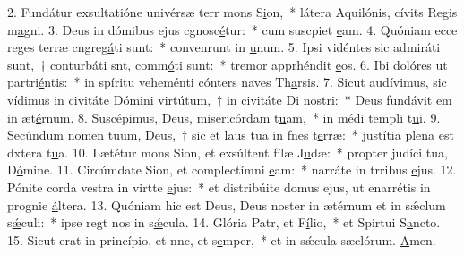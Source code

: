 2. Fundátur exsultatióne univérsæ terr mons S\uline{i}on,~* látera Aquilónis, cívits Regis m\uline{a}gni.
3. Deus in dómibus ejus cgnosc\uline{é}tur:~* cum suscpiet \uline{e}am.
4. Quóniam ecce reges terræ cngreg\uline{á}ti sunt:~* convenrunt in \uline{u}num.
5. Ipsi vidéntes sic admiráti sunt,~† conturbáti snt, comm\uline{ó}ti sunt:~* tremor apprhéndit \uline{e}os.
6. Ibi dolóres ut partri\uline{é}ntis:~* in spíritu veheménti cónters naves Th\uline{a}rsis.
7. Sicut audívimus, sic vídimus in civitáte Dómini virtútum,~† in civitáte Di n\uline{o}stri:~* Deus fundávit em in æt\uline{é}rnum.
8. Suscépimus, Deus, misericórdam t\uline{u}am,~* in médi templi t\uline{u}i.
9. Secúndum nomen tuum, Deus,~† sic et laus tua in fnes t\uline{e}rræ:~* justítia plena est dxtera t\uline{u}a.
10. Lætétur mons Sion, et exsúltent fílæ J\uline{u}dæ:~* propter judíci tua, D\uline{ó}mine.
11. Circúmdate Sion, et complectímni \uline{e}am:~* narráte in trribus \uline{e}jus.
12. Pónite corda vestra in virtte \uline{e}jus:~* et distribúite domus ejus, ut enarrétis in prognie \uline{á}ltera.
13. Quóniam hic est Deus, Deus noster in ætérnum et in sǽclum s\uline{ǽ}culi:~* ipse regt nos in s\uline{ǽ}cula.
14. Glória Patr, et F\uline{í}lio,~* et Spirtui S\uline{a}ncto.
15. Sicut erat in princípio, et nnc, et s\uline{e}mper,~* et in sǽcula sæclórum. \uline{A}men.
